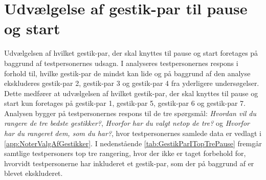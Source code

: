 \section{Udvælgelse af gestik-par til pause og start}
\label{TestresultaterPauseStart}
%
Udvælgelsen af hvilket gestik-par, der skal knyttes til pause og start foretages på baggrund af testpersonernes udsagn. I  analyseres testpersonernes respons i forhold til, hvilke gestik-par de mindst kan lide og på baggrund af den analyse ekskluderes gestik-par 2, gestik-par 3 og gestik-par 4 fra yderligere undersøgelser. Dette medfører at udvælgelsen af hvilket gestik-par, der skal knyttes til pause og start kun foretages på gestik-par 1, gestik-par 5, gestik-par 6 og gestik-par 7. Analysen bygger på testpersonernes respons til de tre spørgsmål: \textit{Hvordan vil du rangere de tre bedste gestikker?}, \textit{Hvorfor har du valgt netop de tre?} og \textit{Hvorfor har du rangeret dem, som du har?}, hvor testpersonernes samlede data er vedlagt i \autoref{app:NoterValgAfGestikker}.\blankline
%  
I nedenstående \autoref{tab:GestikParITopTrePause} fremgår samtlige testpersoners top tre rangering, hvor der ikke er taget forbehold for, hvorvidt testpersonerne har inkluderet et gestik-par, som der på baggrund af  er blevet ekskluderet.
%
